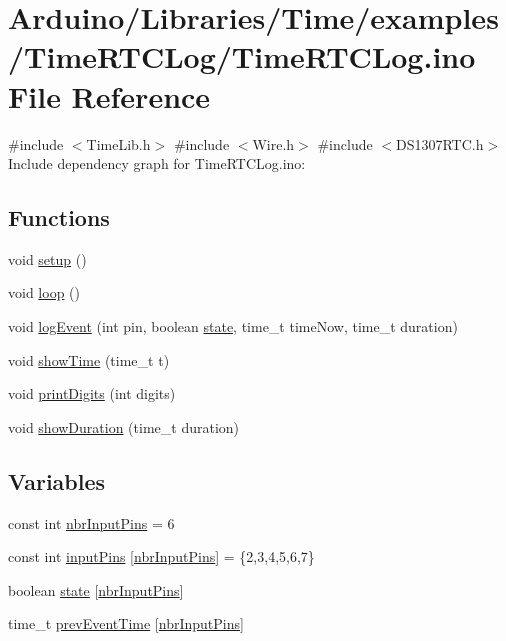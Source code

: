 \hypertarget{_time_r_t_c_log_8ino}{}\section{Arduino/\+Libraries/\+Time/examples/\+Time\+R\+T\+C\+Log/\+Time\+R\+T\+C\+Log.ino File Reference}
\label{_time_r_t_c_log_8ino}
{\ttfamily \#include $<$Time\+Lib.\+h$>$}\newline
{\ttfamily \#include $<$Wire.\+h$>$}\newline
{\ttfamily \#include $<$D\+S1307\+R\+T\+C.\+h$>$}\newline
Include dependency graph for Time\+R\+T\+C\+Log.\+ino\+:
\subsection*{Functions}
\begin{DoxyCompactItemize}
\item 
void \hyperlink{_time_r_t_c_log_8ino_a4fc01d736fe50cf5b977f755b675f11d}{setup} ()
\item 
void \hyperlink{_time_r_t_c_log_8ino_afe461d27b9c48d5921c00d521181f12f}{loop} ()
\item 
void \hyperlink{_time_r_t_c_log_8ino_a158b724b878df3cf6b8476b243ea526d}{log\+Event} (int pin, boolean \hyperlink{_time_r_t_c_log_8ino_a0bb9d7a7fac8ced9421d6103bfbd1855}{state}, time\+\_\+t time\+Now, time\+\_\+t duration)
\item 
void \hyperlink{_time_r_t_c_log_8ino_a69d5d357d188f3b15e4d959d5b37e0b5}{show\+Time} (time\+\_\+t t)
\item 
void \hyperlink{_time_r_t_c_log_8ino_a772afab0396032477ec7b01d14c774b2}{print\+Digits} (int digits)
\item 
void \hyperlink{_time_r_t_c_log_8ino_ae08e98ce510140d68becbfb30e3e0cd8}{show\+Duration} (time\+\_\+t duration)
\end{DoxyCompactItemize}
\subsection*{Variables}
\begin{DoxyCompactItemize}
\item 
const int \hyperlink{_time_r_t_c_log_8ino_ac8d580ffe5e5f45699f37478755e0f9a}{nbr\+Input\+Pins} = 6
\item 
const int \hyperlink{_time_r_t_c_log_8ino_a2c88dea2053e96e8b031f5396f81edbb}{input\+Pins} \mbox{[}\hyperlink{_time_r_t_c_log_8ino_ac8d580ffe5e5f45699f37478755e0f9a}{nbr\+Input\+Pins}\mbox{]} = \{2,3,4,5,6,7\}
\item 
boolean \hyperlink{_time_r_t_c_log_8ino_a0bb9d7a7fac8ced9421d6103bfbd1855}{state} \mbox{[}\hyperlink{_time_r_t_c_log_8ino_ac8d580ffe5e5f45699f37478755e0f9a}{nbr\+Input\+Pins}\mbox{]}
\item 
time\+\_\+t \hyperlink{_time_r_t_c_log_8ino_a5ff4d956f4cef0ab16dbdcc42da26da0}{prev\+Event\+Time} \mbox{[}\hyperlink{_time_r_t_c_log_8ino_ac8d580ffe5e5f45699f37478755e0f9a}{nbr\+Input\+Pins}\mbox{]}
\end{DoxyCompactItemize}



